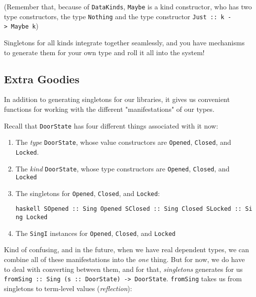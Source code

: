 \documentclass[]{article}
\begin{document}
(Remember that, because of \texttt{DataKinds}, \texttt{Maybe} is a kind
constructor, who has two type constructors, the type
\texttt{\textquotesingle{}Nothing} and the type constructor
\texttt{\textquotesingle{}Just\ ::\ k\ -\textgreater{}\ Maybe\ k})

Singletons for all kinds integrate together seamlessly, and you have mechanisms
to generate them for your own type and roll it all into the system!

\subsection{Extra Goodies}

In addition to generating singletons for our libraries, it gives us convenient
functions for working with the different "manifestations" of our types.

Recall that \texttt{DoorState} has four different things associated with it now:

\begin{enumerate}
\item
  The \emph{type} \texttt{DoorState}, whose value constructors are
  \texttt{Opened}, \texttt{Closed}, and \texttt{Locked}.
\item
  The \emph{kind} \texttt{DoorState}, whose type constructors are
  \texttt{\textquotesingle{}Opened}, \texttt{\textquotesingle{}Closed}, and
  \texttt{\textquotesingle{}Locked}
\item
  The singletons for \texttt{\textquotesingle{}Opened},
  \texttt{\textquotesingle{}Closed}, and \texttt{\textquotesingle{}Locked}:

  \texttt{haskell\ SOpened\ ::\ Sing\ \textquotesingle{}Opened\ SClosed\ ::\ Sing\ \textquotesingle{}Closed\ SLocked\ ::\ Sing\ \textquotesingle{}Locked}
\item
  The \texttt{SingI} instances for \texttt{\textquotesingle{}Opened},
  \texttt{\textquotesingle{}Closed}, and
  \texttt{\textquotesingle{}Locked\textquotesingle{}}
\end{enumerate}

Kind of confusing, and in the future, when we have real dependent types, we can
combine all of these manifestations into the \emph{one} thing. But for now, we
do have to deal with converting between them, and for that, \emph{singletons}
generates for us
\texttt{fromSing\ ::\ Sing\ (s\ ::\ DoorState)\ -\textgreater{}\ DoorState}.
\texttt{fromSing} takes us from singletons to term-level values
(\emph{reflection}):
\end{document}
